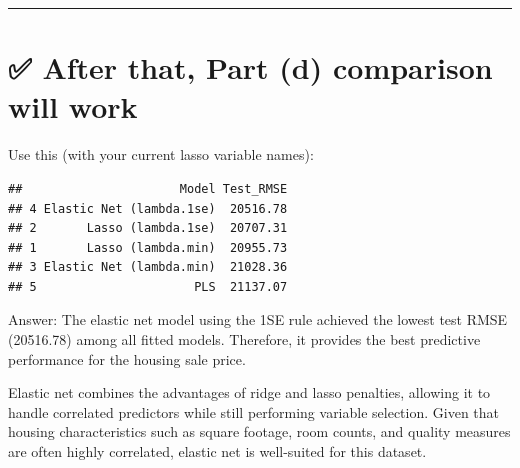 \documentclass[
]{article}
\newenvironment{Shaded}{\begin{snugshade}}{\end{snugshade}}
\newcommand{\AttributeTok}[1]{\textcolor[rgb]{0.13,0.29,0.53}{#1}}
\newcommand{\FunctionTok}[1]{\textcolor[rgb]{0.13,0.29,0.53}{\textbf{#1}}}
\newcommand{\NormalTok}[1]{#1}
\newcommand{\OtherTok}[1]{\textcolor[rgb]{0.56,0.35,0.01}{#1}}
\newcommand{\SpecialCharTok}[1]{\textcolor[rgb]{0.81,0.36,0.00}{\textbf{#1}}}
\newcommand{\StringTok}[1]{\textcolor[rgb]{0.31,0.60,0.02}{#1}}
\begin{document}
\begin{center}\rule{0.5\linewidth}{0.5pt}\end{center}

\section{✅ After that, Part (d) comparison will
work}\label{after-that-part-d-comparison-will-work}

Use this (with your current lasso variable names):

\begin{Shaded}
\end{Shaded}

\begin{verbatim}
##                      Model Test_RMSE
## 4 Elastic Net (lambda.1se)  20516.78
## 2       Lasso (lambda.1se)  20707.31
## 1       Lasso (lambda.min)  20955.73
## 3 Elastic Net (lambda.min)  21028.36
## 5                      PLS  21137.07
\end{verbatim}

Answer: The elastic net model using the 1SE rule achieved the lowest
test RMSE (20516.78) among all fitted models. Therefore, it provides the
best predictive performance for the housing sale price.

Elastic net combines the advantages of ridge and lasso penalties,
allowing it to handle correlated predictors while still performing
variable selection. Given that housing characteristics such as square
footage, room counts, and quality measures are often highly correlated,
elastic net is well-suited for this dataset.
\end{document}
